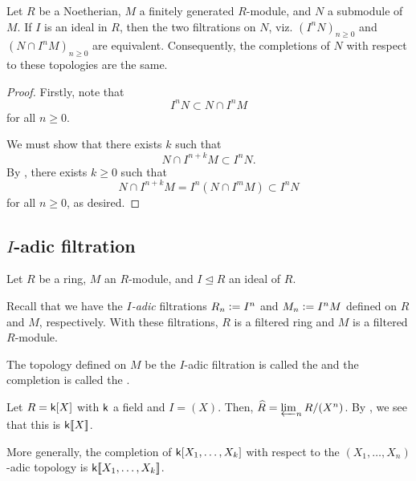 
\begin{cor} \label{cor:artin-rees-isomorphic-completions}
	Let $R$ be a Noetherian, $M$ a finitely generated $R$-module, and $N$ a submodule of $M$. If $I$ is an ideal in $R$, then the two filtrations on $N$, viz. $(I^{n} N)_{n \ge 0}$ and $(N \cap I^{n} M)_{n \ge 0}$ are equivalent. Consequently, the completions of $N$ with respect to these topologies are the same.
\end{cor}
\begin{proof} 
	Firstly, note that
	\begin{equation*} 
		I^{n} N \subset N \cap I^{n} M
	\end{equation*}
	for all $n \ge 0$.

	We must show that there exists $k$ such that
	\begin{equation*} 
		N \cap I^{n + k} M \subset I^{n} N.
	\end{equation*}
	By , there exists $k \ge 0$ such that
	\begin{equation*} 
		N \cap I^{n + k} M = I^{n} (N \cap I^{m} M) \subset I^{n} N
	\end{equation*}
	for all $n \ge 0$, as desired.
\end{proof}

\subsection{\texorpdfstring{$I$}{I}-adic filtration}

Let $R$ be a ring, $M$ an $R$-module, and $I \unlhd R$ an ideal of $R$.

Recall that we have the \emph{$I$-adic} filtrations $R_{n} \vcentcolon= I^{n}$ and $M_{n} \vcentcolon= I^{n} M$ defined on $R$ and $M$, respectively. With these filtrations, $R$ is a filtered ring and $M$ is a filtered $R$-module.

\begin{defn}
	The topology defined on $M$ be the $I$-adic filtration is called the  and the completion is called the .
\end{defn}

\begin{ex}
	Let $R = \mathsf{k}[X]$ with $\mathsf{k}$ a field and $I = (X)$. Then, $\widehat{R} = \varprojlim_{n} R/(X^{n})$. By , we see that this is $\mathsf{k}[\![X]\!]$.

	More generally, the completion of $\mathsf{k}[X_{1}, \ldots, X_{k}]$ with respect to the $(X_{1}, \ldots, X_{n})$-adic topology is $\mathsf{k}[\![X_{1}, \ldots, X_{k}]\!]$.
\end{ex}

